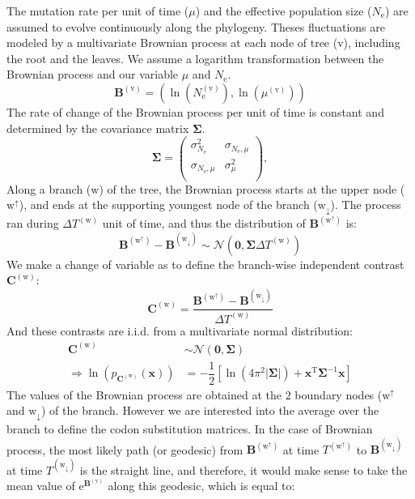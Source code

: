 \documentclass{article}
\newcommand{\e}{\mathrm{e}}
\newcommand{\Ne}{N_\e}
\newcommand{\branch}{\text{w}}
\newcommand{\branchexp}{^{(\branch)}}
\newcommand{\up}{\branch^{\uparrow}}
\newcommand{\down}{\branch_{\downarrow}}
\newcommand{\node}{\text{v}}
\newcommand{\age}{T}
\newcommand{\branchtime}{\Delta \age}
\newcommand{\brownian}{\bm{B}}
\newcommand{\contrast}{\bm{C}}
\newcommand{\covariance}{\bm{\Sigma}}
\begin{document}
The mutation rate per unit of time ($\mu$) and the effective population size ($\Ne$) are assumed to evolve continuously along the phylogeny. Theses fluctuations are modeled by a multivariate Brownian process at each node of tree ($\node$), including the root and the leaves. We assume a logarithm transformation between the Brownian process and our variable $\mu$ and $\Ne$.
\begin{equation}
\brownian^{(\node)}=\left(\ln\left(\Ne^{(\node)}\right), \ln\left(\mu^{(\node)}\right)\right)
\end{equation}
The rate of change of the Brownian process per unit of time is constant and determined by the covariance matrix $\covariance$.
\begin{equation}
\covariance = \begin{pmatrix}
\sigma_{\Ne}^2 & \sigma_{\Ne, \mu}  \\ 
\sigma_{\Ne, \mu} & \sigma_{\mu}^2 \\ 
\end{pmatrix},
\end{equation}
Along a branch ($\branch$) of the tree, the Brownian process starts at the upper node ($\up$), and ends at the supporting youngest node of the branch ($\down$). The process ran during $\branchtime\branchexp$ unit of time, and thus the distribution of $\brownian^{(\up)}$ is:
\begin{equation}
\brownian^{(\up)} - \brownian^{(\down)}  \sim \mathcal{N}\left(\bm{0}, \covariance \branchtime\branchexp \right)
\end{equation}
We make a change of variable as to define the branch-wise independent contrast $\contrast\branchexp$:
\begin{equation}
\label{eq:independent_contrast}
\contrast\branchexp = \dfrac{\brownian^{(\up)} - \brownian^{(\down)}}{\branchtime\branchexp} 
\end{equation}
And these contrasts are i.i.d. from a multivariate normal distribution:
\begin{align}
\label{eq:Distribcontrast}
\contrast\branchexp & \sim \mathcal{N}\left(\bm{0}, \covariance \right) \\
\Rightarrow \ln \left(p_{\contrast\branchexp}\left(\bm{x}\right)\right) & = - \dfrac{1}{2}\left[\ln \left( 4\pi^2 \left| \covariance \right| \right) + \bm{x}^{\mathrm{T}} \covariance^{-1} \bm{x} \right]
\end{align}
The values of the Brownian process are obtained at the $2$ boundary nodes ($\up$ and $\down$) of the branch. However we are interested into the average over the branch to define the codon substitution matrices. In the case of Brownian process, the most likely path (or geodesic) from $\brownian^{(\up)}$ at time $T^{(\up)}$ to $\brownian^{(\down)}$ at time $T^{(\down)}$ is the straight line, and therefore, it would make sense to take the mean value of $\e^{\brownian^{(\node)}}$ along this geodesic, which is equal to:
\end{document}
